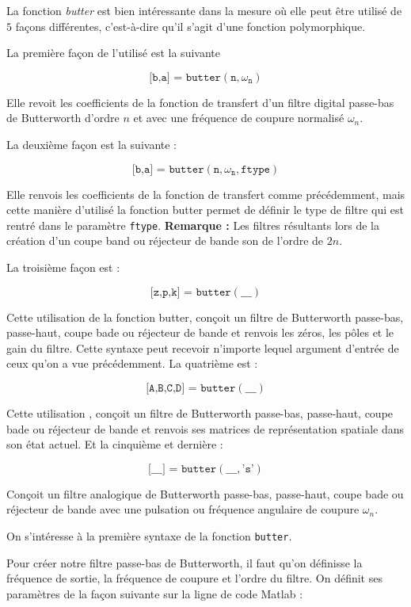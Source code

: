 \documentclass[conference,onecolumn]{IEEEtran}
\begin{document}
La fonction \textit{butter} est bien intéressante dans la mesure où elle peut être utilisé de $5$ façons différentes, c’est-à-dire qu’il s’agit d’une fonction polymorphique. 

La première façon de l’utilisé est la suivante


\[\texttt{[b,a] = butter}(\texttt{n},\omega_\texttt{n})\]

Elle revoit les coefficients de la fonction de transfert d’un filtre digital passe-bas de Butterworth d’ordre $n$ et avec une fréquence de coupure normalisé $\omega_n$. 

La deuxième façon est la suivante :

\[\texttt{[b,a] = butter}(\texttt{n},\omega_\texttt{n}, \texttt{ftype})\]

Elle renvois les coefficients de la fonction de transfert comme précédemment, mais cette manière d’utilisé la fonction butter permet de définir le type de filtre qui est rentré dans le paramètre \texttt{ftype}. \textbf{Remarque :} Les filtres résultants lors de la création d’un coupe band ou réjecteur de bande son de l’ordre de $2n$.

La troisième façon est :

\[\texttt{[z,p,k] = butter}(\_\_\_)\]

Cette utilisation de la fonction butter, conçoit un filtre de Butterworth passe-bas, passe-haut, coupe bade ou réjecteur de bande et renvois les zéros, les pôles et le gain du filtre. Cette syntaxe peut recevoir n’importe lequel argument d’entrée de ceux qu’on a vue précédemment.
La quatrième est :

\[\texttt{[A,B,C,D] = butter}(\_\_\_)\]

Cette utilisation , conçoit un filtre de Butterworth passe-bas, passe-haut, coupe bade ou réjecteur de bande et renvois ses matrices de représentation spatiale dans son état actuel.
Et la cinquième et dernière :

\[\texttt{[\_\_\_] = butter}(\_\_\_,\texttt{'s'})\]

Conçoit un filtre analogique de Butterworth passe-bas, passe-haut, coupe bade ou réjecteur de bande avec une pulsation ou fréquence angulaire de coupure $\omega_n$.

On s’intéresse à la première syntaxe de la fonction \texttt{butter}.

Pour créer notre filtre passe-bas de Butterworth, il faut qu’on définisse la fréquence de sortie, la fréquence de coupure et l’ordre du filtre. 
On définit ses paramètres de la façon suivante sur la ligne de code Matlab :
\end{document}
